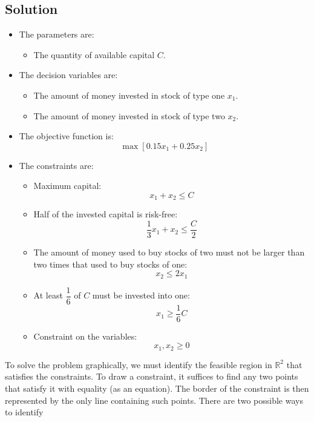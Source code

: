 \documentclass[12pt, a4paper]{report}
\newtheorem[style=M,bodystyle=\normalfont]{theorem}{Theorem}
\newtheorem[style=M,bodystyle=\normalfont]{corollary}{Corollary}
\newtheorem[style=M,bodystyle=\normalfont]{lemma}{Lemma}
\newtheorem[style=M,bodystyle=\normalfont]{definition}{Definition}
\begin{document}
    \subsection*{Solution}
        \begin{itemize}
            \item The parameters are: 
                \begin{itemize}
                    \item The quantity of available capital $C$. 
                \end{itemize}
            \item The decision variables are:
                \begin{itemize}
                    \item The amount of money invested in stock of type one $x_1$. 
                    \item The amount of money invested in stock of type two $x_2$. 
                \end{itemize}
            \item The objective function is: 
                \[\max{\left[0.15x_1+0.25x_2\right]}\]
            \item The constraints are:
                \begin{itemize}
                    \item Maximum capital: 
                        \[x_1+x_2 \leq C\]
                    \item Half of the invested capital is risk-free:
                        \[\dfrac{1}{3}x_1+x_2 \leq \dfrac{C}{2}\]
                    \item The amount of money used to buy stocks of two must not be larger than two times that used to buy stocks of one:
                        \[x_2 \leq 2x_1\]
                    \item At least $\dfrac{1}{6}$ of $C$ must be invested into one: 
                        \[x_1 \geq \dfrac{1}{6}C\]
                    \item Constraint on the variables:
                        \[x_1,x_2 \geq 0\]
                \end{itemize}
        \end{itemize}
        To solve the problem graphically, we must identify the feasible region in $\mathbb{R}^2$ that satisfies the constraints. To draw a constraint, it suffices to find any two points 
        that satisfy it with equality (as an equation). The border of the constraint is then represented by the only line containing such points. There are two possible ways to identify 
\end{document}
